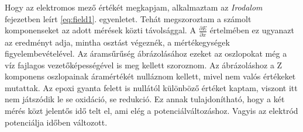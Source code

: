 Hogy az elektromos mező értékét megkapjam, alkalmaztam az \emph{Irodalom} fejezetben leírt \ref{eq:field1}. egyenletet. Tehát megszoroztam a számolt komponenseket az adott mérések közti távolsággal. A $\frac{\partial E}{\partial x}$ értelmében ez ugyanazt az eredményt adja, mintha osztást végeznék, a mértékegységek figyelembevételével. Az áramsűrűség ábrázolásához ezeket az oszlopokat még a víz fajlagos vezetőképességével is meg kellett szoroznom. Az ábrázoláshoz a Z komponens oszlopainak áramértékét nulláznom kellett, mivel nem valós értékeket mutattak. Az epoxi gyanta felett is nullától különböző értéket kaptam, viszont itt nem játszódik le se oxidáció, se redukció. Ez annak tulajdonítható, hogy a két mérés közt jelentős idő telt el, ami elég a potenciálváltozáshoz. Vagyis az elektród potenciálja időben változott.
